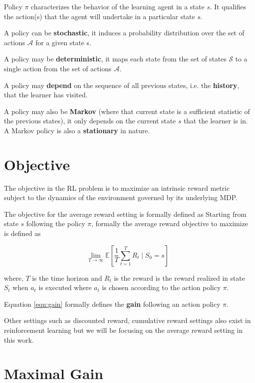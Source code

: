 Policy $\pi$ characterizes the behavior of the learning agent in a state $s$. 
It qualifies the action(s) that the agent will undertake in a particular state $s$.

A policy can be \textbf{stochastic}, it induces a probability distribution over the set of actions $\mathcal{A}$ for a given state s.

A policy may be \textbf{deterministic}, it maps each state from the set of states $\mathcal{S}$ to a single action from the set of actions $\mathcal{A}$.

A policy may \textbf{depend} on the sequence of all previous states, i.e. the \textbf{history}, that the learner has visited. 

A policy may also be \textbf{Markov} (where that current state is a sufficient statistic of the previous states), it only depends on the current state $s$ that the learner is in. 
A Markov policy is also a \textbf{stationary} in nature.

\section{Objective}

The objective in the RL problem is to maximize an intrinsic reward metric subject to the dynamics of the environment governed by its underlying MDP.

The objective for the average reward setting is formally defined as
Starting from state $s$ following the policy $\pi$, formally the average reward objective to maximize is defined as

\begin{equation}
    \label{eqn:gain}
    \lim_{T \to \infty} \mathbb{E}\left[\frac{1}{T} \sum_{t=1}^{T} R_t \mid S_0 = s\right]
\end{equation}

where, $T$ is the time horizon and $R_t$ is the reward is the reward realized in state $S_t$ when $a_t$ is executed where $a_t$ is chosen according to the action policy $\pi$.

Equation \ref{eqn:gain} formally defines the \textbf{gain} following an action policy $\pi$.

Other settings such as discounted reward, cumulative reward settings also exist in reinforcement learning but we will be focusing on the average reward setting in this work.

\section{Maximal Gain}

